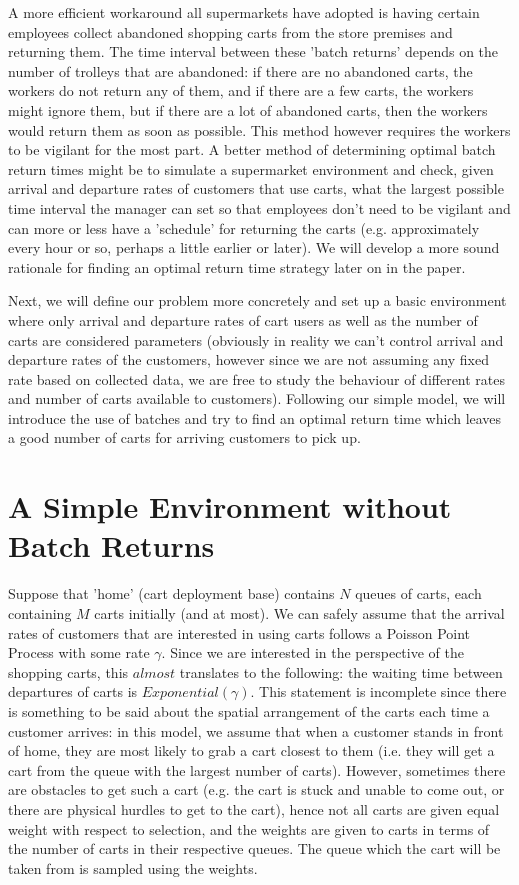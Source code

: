 \documentclass[english]{article}
\begin{document}
A more efficient workaround all supermarkets have adopted is having certain employees collect abandoned shopping carts from the store premises and returning them. The time interval between these 'batch returns' depends on the number of trolleys that are abandoned: if there are no abandoned carts, the workers do not return any of them, and if there are a few carts, the workers might ignore them, but if there are a lot of abandoned carts, then the workers would return them as soon as possible. This method however requires the workers to be vigilant for the most part. A better method of determining optimal batch return times might be to simulate a supermarket environment and check, given arrival and departure rates of customers that use carts, what the largest possible time interval the manager can set so that employees don't need to be vigilant and can more or less have a 'schedule' for returning the carts (e.g. approximately every hour or so, perhaps a little earlier or later). We will develop a more sound rationale for finding an optimal return time strategy later on in the paper.

Next, we will define our problem more concretely and set up a basic environment where only arrival and departure rates of cart users as well as the number of carts are considered parameters (obviously in reality we can't control arrival and departure rates of the customers, however since we are not assuming any fixed rate based on collected data, we are free to study the behaviour of different rates and number of carts available to customers). Following our simple model, we will introduce the use of batches and try to find an optimal return time which leaves a good number of carts for arriving customers to pick up.

\section*{A Simple Environment without Batch Returns}

Suppose that 'home' (cart deployment base) contains $N$ queues of carts, each containing $M$ carts initially (and at most). We can safely assume that the arrival rates of customers that are interested in using carts follows a Poisson Point Process with some rate $\gamma$. Since we are interested in the perspective of the shopping carts, this $almost$ translates to the following: the waiting time between departures of carts is $Exponential(\gamma)$. This statement is incomplete since there is something to be said about the spatial arrangement of the carts each time a customer arrives: in this model, we assume that when a customer stands in front of home, they are most likely to grab a cart closest to them (i.e. they will get a cart from the queue with the largest number of carts). However, sometimes there are obstacles to get such a cart (e.g. the cart is stuck and unable to come out, or there are physical hurdles to get to the cart), hence not all carts are given equal weight with respect to selection, and the weights are given to carts in terms of the number of carts in their respective queues. The queue which the cart will be taken from is sampled using the weights.
\end{document}
